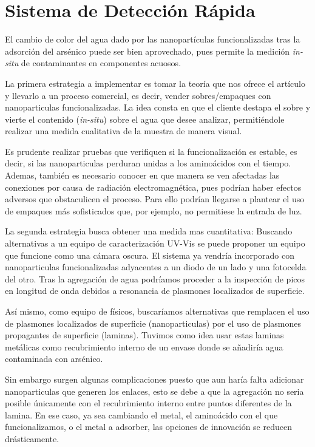 \section{Sistema de Detección Rápida}

El cambio de color del agua dado por las nanopartículas funcionalizadas tras la
adsorción del arsénico puede ser bien aprovechado, pues permite la medición
\emph{in-situ} de contaminantes en componentes acuosos.

La primera estrategia a implementar es tomar la teoría que nos ofrece el
artículo y llevarlo a un proceso comercial, es decir, vender sobres/empaques con
nanoparticulas funcionalizadas. La idea consta en que el cliente destapa el
sobre y vierte el contenido (\emph{in-situ}) sobre el agua que desee analizar,
permitiéndole realizar una medida cualitativa de la muestra de manera visual.

Es prudente realizar pruebas que verifiquen si la funcionalización es estable,
es decir, si las nanoparticulas perduran unidas a los aminoácidos con el tiempo.
Ademas, también es necesario conocer en que manera se ven afectadas las
conexiones por causa de radiación electromagnética, pues podrían haber efectos
adversos que obstaculicen el proceso. Para ello podrían llegarse a plantear el
uso de empaques más sofisticados que, por ejemplo, no permitiese la entrada de
luz.

La segunda estrategia busca obtener una medida mas cuantitativa: Buscando
alternativas a un  equipo de caracterización UV-Vis se puede proponer un equipo
que funcione como una cámara oscura. El sistema ya vendría incorporado con
nanoparticulas funcionalizadas adyacentes a un diodo de un lado y una fotocelda
del otro. Tras la agregación de agua podríamos proceder a la inspección de picos
en longitud de onda debidos a resonancia de plasmones localizados de superficie.

Así mismo, como equipo de físicos, buscaríamos alternativas que remplacen el uso
de plasmones localizados de superficie (nanoparticulas) por el uso de plasmones
propagantes de superficie (laminas). Tuvimos como idea usar estas laminas
metálicas como recubrimiento interno de un envase donde se añadiría agua
contaminada con arsénico.

Sin embargo surgen algunas complicaciones puesto que aun haría falta adicionar
nanoparticulas que generen los enlaces, esto se debe a que la agregación no
seria posible únicamente con el recubrimiento interno entre puntos diferentes de
la lamina. En ese caso, ya sea cambiando el metal, el aminoácido con el que
funcionalizamos, o el metal a adsorber, las opciones de innovación se reducen
drásticamente.
